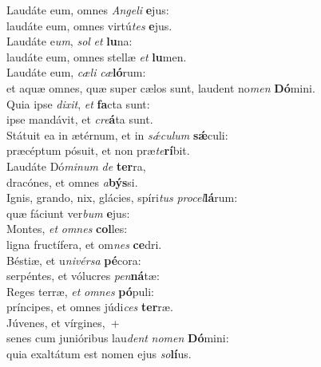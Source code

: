 \evenverse Laudáte eum, omnes \textit{An}\textit{ge}\textit{li} \textbf{e}jus:~\*\\
\evenverse laudáte eum, omnes virtú\textit{tes} \textbf{e}jus.\\
\oddverse Laudáte e\textit{um}, \textit{sol} \textit{et} \textbf{lu}na:~\*\\
\oddverse laudáte eum, omnes stellæ \textit{et} \textbf{lu}men.\\
\evenverse Laudáte eum, \textit{cæ}\textit{li} \textit{cæ}\textbf{ló}rum:~\*\\
\evenverse et aquæ omnes, quæ super cælos sunt, laudent no\textit{men} \textbf{Dó}mini.\\
\oddverse Quia ipse \textit{di}\textit{xit}, \textit{et} \textbf{fa}cta sunt:~\*\\
\oddverse ipse mandávit, et \textit{cre}\textbf{á}ta sunt.\\
\evenverse Státuit ea in ætérnum, et in \textit{sǽ}\textit{cu}\textit{lum} \textbf{sǽ}culi:~\*\\
\evenverse præcéptum pósuit, et non præ\textit{te}\textbf{rí}bit.\\
\oddverse Laudáte Dó\textit{mi}\textit{num} \textit{de} \textbf{ter}ra,~\*\\
\oddverse dracónes, et omnes \textit{a}\textbf{býs}si.\\
\evenverse Ignis, grando, nix, glácies, spíri\textit{tus} \textit{pro}\textit{cel}\textbf{lá}rum:~\*\\
\evenverse quæ fáciunt ver\textit{bum} \textbf{e}jus:\\
\oddverse Montes, \textit{et} \textit{om}\textit{nes} \textbf{col}les:~\*\\
\oddverse ligna fructífera, et om\textit{nes} \textbf{ce}dri.\\
\evenverse Béstiæ, et u\textit{ni}\textit{vér}\textit{sa} \textbf{pé}cora:~\*\\
\evenverse serpéntes, et vólucres \textit{pen}\textbf{ná}tæ:\\
\oddverse Reges terræ, \textit{et} \textit{om}\textit{nes} \textbf{pó}puli:~\*\\
\oddverse príncipes, et omnes júdi\textit{ces} \textbf{ter}ræ.\\
\evenverse Júvenes, et vírgines,~+\\
\evenverse  senes cum junióribus lau\textit{dent} \textit{no}\textit{men} \textbf{Dó}mini:~\*\\
\evenverse quia exaltátum est nomen ejus \textit{so}\textbf{lí}us.\\
